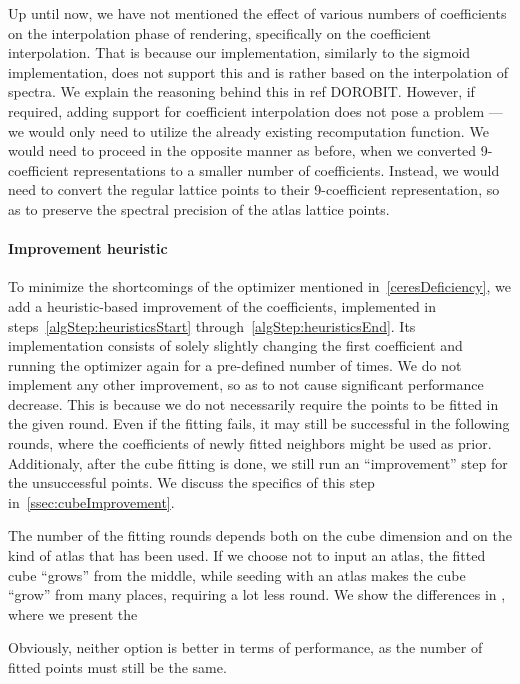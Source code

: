 Up until now, we have not mentioned the effect of various numbers of coefficients on the interpolation phase of rendering, specifically on the coefficient interpolation. That is because our implementation, similarly to the sigmoid implementation, does not support this and is rather based on the interpolation of spectra. We explain the reasoning behind this in ref DOROBIT. However, if required, adding support for coefficient interpolation does not pose a problem --- we would only need to utilize the already existing recomputation function. We would need to proceed in the opposite manner as before, when we converted 9-coefficient representations to a smaller number of coefficients. Instead, we would need to convert the regular lattice points to their 9-coefficient representation, so as to preserve the spectral precision of the atlas lattice points.

\paragraph{Improvement heuristic} \label{par:improvementHeuristics}

To minimize the shortcomings of the optimizer mentioned in~\cref{ceresDeficiency}, we add a heuristic-based improvement of the coefficients, implemented in steps~\ref{algStep:heuristicsStart} through~\ref{algStep:heuristicsEnd}. Its implementation consists of solely slightly changing the first coefficient and running the optimizer again for a pre-defined number of times. We do not implement any other improvement, so as to not cause significant performance decrease. This is because we do not necessarily require the points to be fitted in the given round. Even if the fitting fails, it may still be successful in the following rounds, where the coefficients of newly fitted neighbors might be used as prior. Additionaly, after the cube fitting is done, we still run an ``improvement'' step for the unsuccessful points. We discuss the specifics of this step in~\cref{ssec:cubeImprovement}.

The number of the fitting rounds depends both on the cube dimension and on the kind of atlas that has been used. If we choose not to input an atlas, the fitted cube ``grows'' from the middle, while seeding with an atlas makes the cube ``grow'' from many places, requiring a lot less round. We show the differences in , where we present the 

Obviously, neither option is better in terms of performance, as the number of fitted points must still be the same.


